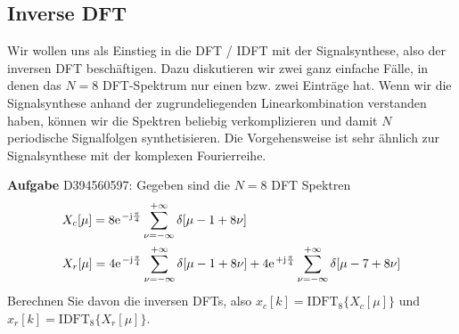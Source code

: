 \clearpage
\subsection{Inverse DFT}
\label{sec:D394560597}
\begin{Ziel}
Wir wollen uns als Einstieg in die DFT / IDFT mit der Signalsynthese, also
der inversen DFT beschäftigen. Dazu diskutieren wir zwei ganz einfache
Fälle, in denen das $N=8$ DFT-Spektrum nur einen bzw. zwei Einträge hat.
Wenn wir die Signalsynthese anhand der zugrundeliegenden Linearkombination
verstanden haben, können wir die Spektren beliebig verkomplizieren und damit
$N$ periodische Signalfolgen synthetisieren.
Die Vorgehensweise ist sehr ähnlich zur Signalsynthese mit der komplexen
Fourierreihe.
\end{Ziel}
\textbf{Aufgabe} {\tiny D394560597}: Gegeben sind die $N=8$ DFT Spektren
\begin{align}
&X_c[\mu] = 8\e^{-\im\frac{\pi}{4}} \sum_{\nu=-\infty}^{+\infty} \delta[\mu-1 + 8\nu]\\
&X_r[\mu] =
4\e^{-\im\frac{\pi}{4}} \sum_{\nu=-\infty}^{+\infty} \delta[\mu-1 + 8\nu] +
4\e^{+\im\frac{\pi}{4}} \sum_{\nu=-\infty}^{+\infty} \delta[\mu-7 + 8\nu]
\end{align}
Berechnen Sie davon die inversen DFTs, also $x_c[k] = \text{IDFT}_8\{X_c[\mu]\}$
und $x_r[k] = \text{IDFT}_8\{X_r[\mu]\}$.

